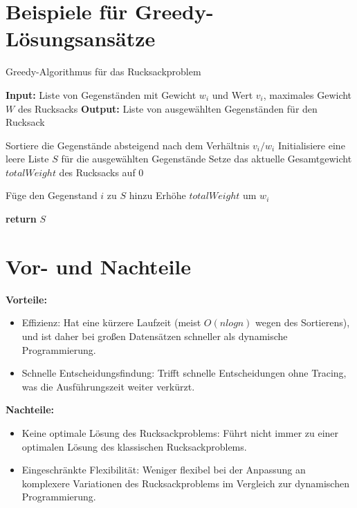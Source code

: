 \documentclass[12pt]{report}
\begin{document}
\section{Beispiele für Greedy-Lösungsansätze}
\begin{algorithm}
	\caption{Greedy-Algorithmus für das Rucksackproblem}
	\begin{algorithmic}[1]
		\State \textbf{Input:} Liste von Gegenständen mit Gewicht $w_i$ und Wert $v_i$, maximales Gewicht $W$ des Rucksacks
		\State \textbf{Output:} Liste von ausgewählten Gegenständen für den Rucksack
		
		\State Sortiere die Gegenstände absteigend nach dem Verhältnis $v_i/w_i$
		\State Initialisiere eine leere Liste $S$ für die ausgewählten Gegenstände
		\State Setze das aktuelle Gesamtgewicht $totalWeight$ des Rucksacks auf $0$
		
		\State Füge den Gegenstand $i$ zu $S$ hinzu
		\State Erhöhe $totalWeight$ um $w_i$
		\EndIf
		\EndFor
		
		\State \textbf{return} $S$
	\end{algorithmic}
\end{algorithm}

\section{Vor- und Nachteile}
\textbf{Vorteile:} 
\begin{itemize}
	\item Effizienz: Hat eine kürzere Laufzeit (meist $O(nlogn)$ wegen des Sortierens), und ist daher bei großen Datensätzen schneller als dynamische Programmierung.
	\item Schnelle Entscheidungsfindung: Trifft schnelle Entscheidungen ohne Tracing, was die Ausführungszeit weiter verkürzt.
\end{itemize}

\textbf{Nachteile:}	
\begin{itemize}
	\item Keine optimale Lösung des Rucksackproblems: Führt nicht immer zu einer optimalen Lösung des klassischen Rucksackproblems.
	\item Eingeschränkte Flexibilität: Weniger flexibel bei der Anpassung an komplexere Variationen des Rucksackproblems im Vergleich zur dynamischen Programmierung.
\end{itemize}
\end{document}
